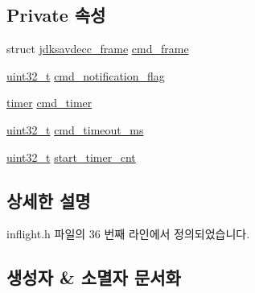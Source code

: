 \subsection*{Private 속성}
\begin{DoxyCompactItemize}
\item 
struct \hyperlink{structjdksavdecc__frame}{jdksavdecc\+\_\+frame} \hyperlink{classavdecc__lib_1_1inflight_a88a6b7b79f4e053abd5803938d5fb6ee}{cmd\+\_\+frame}
\item 
\hyperlink{parse_8c_a6eb1e68cc391dd753bc8ce896dbb8315}{uint32\+\_\+t} \hyperlink{classavdecc__lib_1_1inflight_a6dadf217e8508c79699a9c18121f9217}{cmd\+\_\+notification\+\_\+flag}
\item 
\hyperlink{classavdecc__lib_1_1timer}{timer} \hyperlink{classavdecc__lib_1_1inflight_ae057e2c8b0dbeef2168924fdbc196d06}{cmd\+\_\+timer}
\item 
\hyperlink{parse_8c_a6eb1e68cc391dd753bc8ce896dbb8315}{uint32\+\_\+t} \hyperlink{classavdecc__lib_1_1inflight_afb6cdde363389e3856f0fe11955c34ba}{cmd\+\_\+timeout\+\_\+ms}
\item 
\hyperlink{parse_8c_a6eb1e68cc391dd753bc8ce896dbb8315}{uint32\+\_\+t} \hyperlink{classavdecc__lib_1_1inflight_aacd1252015b57c1a930e3a48a5e15ec2}{start\+\_\+timer\+\_\+cnt}
\end{DoxyCompactItemize}


\subsection{상세한 설명}


inflight.\+h 파일의 36 번째 라인에서 정의되었습니다.



\subsection{생성자 \& 소멸자 문서화}
